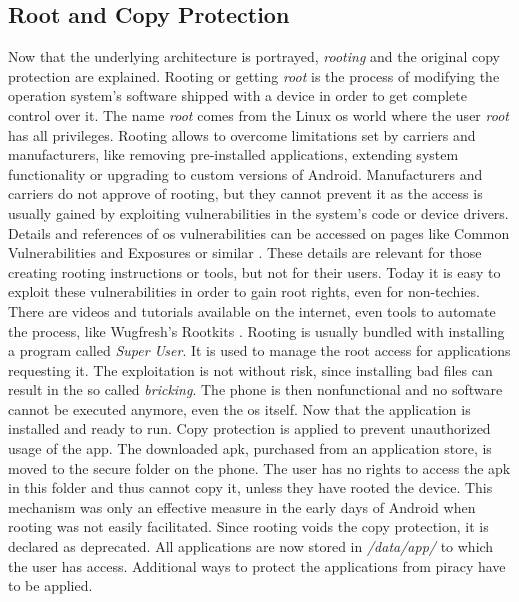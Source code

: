 \subsection{Root and Copy Protection} \label{subsection:android-copyroot}
Now that the underlying architecture is portrayed, \textit{rooting} and the original copy protection are explained.
Rooting or getting \textit{root} is the process of modifying the operation system's software shipped with a device in order to get complete control over it.
The name \textit{root} comes from the Linux \gls{os} world where the user \textit{root} has all privileges.
Rooting allows to overcome limitations set by carriers and manufacturers, like removing pre-installed applications, extending system functionality or upgrading to custom versions of Android.
Manufacturers and carriers do not approve of rooting, but they cannot prevent it as the access is usually gained by exploiting vulnerabilities in the system's code or device drivers.
Details and references of \gls{os} vulnerabilities can be accessed on pages like Common Vulnerabilities and Exposures or similar \cite{cveAndroidPriv} \cite{cveDetails}.
These details are relevant for those creating rooting instructions or tools, but not for their users.
\newline
Today it is easy to exploit these vulnerabilities in order to gain root rights, even for non-techies.
There are videos and tutorials available on the internet, even tools to automate the process, like Wugfresh's Rootkits \cite{wugfresh}.
Rooting is usually bundled with installing a program called \textit{Super User}.
It is used to manage the root access for applications requesting it.
The exploitation is not without risk, since installing bad files can result in the so called \textit{bricking}.
The phone is then nonfunctional and no software cannot be executed anymore, even the \gls{os} itself.
 \cite{androidpoliceRoot}
\newline
Now that the application is installed and ready to run.
Copy protection is applied to prevent unauthorized usage of the app.
The downloaded \gls{apk}, purchased from an application store, is moved to the secure folder on the phone.
The user has no rights to access the \gls{apk} in this folder and thus cannot copy it, unless they have rooted the device.
This mechanism was only an effective measure in the early days of Android when rooting was not easily facilitated.
\newline
Since rooting voids the copy protection, it is declared as deprecated.
All applications are now stored in \textit{/data/app/} to which the user has access.
Additional ways to protect the applications from piracy have to be applied.
